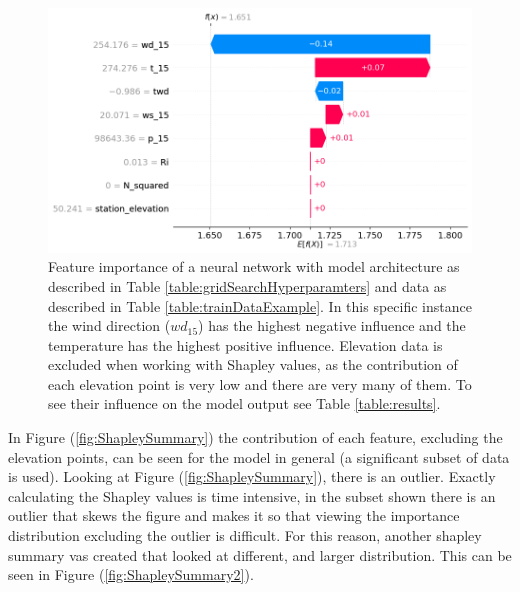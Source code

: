 \begin{figure}[h]
    \centering
    \includegraphics[scale = 0.6]{Figures/shap_plots/waterfall_plot.png}
    \caption[Feature importance for a single observation of a neural network.]{Feature importance of a neural network with model architecture as described in Table \ref{table:gridSearchHyperparamters} and data as described in Table \ref{table:trainDataExample}. In this specific instance the wind direction ($wd_{15}$) has the highest negative influence and the temperature has the highest positive influence. Elevation data is excluded when working with Shapley values, as the contribution of each elevation point is very low and there are very many of them. To see their influence on the model output see Table \ref{table:results}.}
    \label{fig:ShapleyWaterfall}
\end{figure}

In Figure (\ref{fig:ShapleySummary}) the contribution of each feature, excluding the elevation points, can be seen for the model in general (a significant subset of data is used). Looking at Figure (\ref{fig:ShapleySummary}), there is an outlier. Exactly calculating the Shapley values is time intensive, in the subset shown there is an outlier that skews the figure and makes it so that viewing the importance distribution excluding the outlier is difficult. For this reason, another shapley summary vas created that looked at different, and larger distribution. This can be seen in Figure (\ref{fig:ShapleySummary2}).

